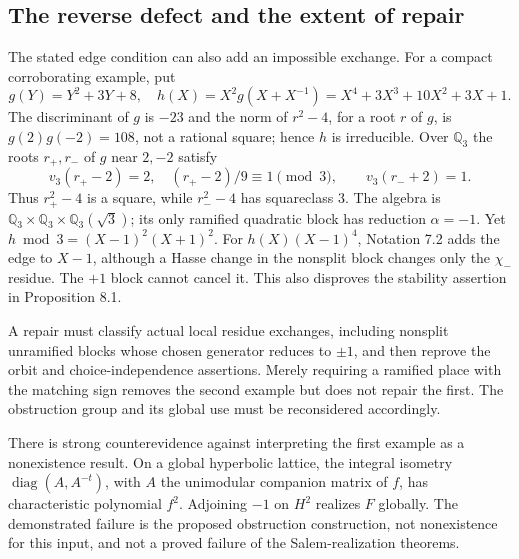 \documentclass[10pt]{article}
\begin{document}
\subsection*{The reverse defect and the extent of repair}
The stated edge condition can also add an impossible exchange. For a compact corroborating example, put \[g(Y)=Y^2+3Y+8,\quad
 h(X)=X^2g(X+X^{-1})=X^4+3X^3+10X^2+3X+1.\] The discriminant of \(g\) is \(-23\) and the norm of \(r^2-4\), for a root \(r\) of \(g\), is \(g(2)g(-2)=108\), not a rational square; hence \(h\) is irreducible. Over \(\mathbb Q_3\) the roots \(r_+,r_-\) of \(g\) near \(2,-2\) satisfy \[v_3(r_+-2)=2,\quad (r_+-2)/9\equiv1\pmod3,\qquad
 v_3(r_-+2)=1.\] Thus \(r_+^2-4\) is a square, while \(r_-^2-4\) has squareclass \(3\). The algebra is \(\mathbb Q_3\times\mathbb Q_3\times\mathbb Q_3(\sqrt3)\); its only ramified quadratic block has reduction \(\alpha=-1\). Yet \(h\bmod3=(X-1)^2(X+1)^2\). For \(h(X)(X-1)^4\), Notation 7.2 adds the edge to \(X-1\), although a Hasse change in the nonsplit block changes only the \(\chi_-\) residue. The \(+1\) block cannot cancel it. This also disproves the stability assertion in Proposition 8.1.\par
A repair must classify actual local residue exchanges, including nonsplit unramified blocks whose chosen generator reduces to \(\pm1\), and then reprove the orbit and choice-independence assertions. Merely requiring a ramified place with the matching sign removes the second example but does not repair the first. The obstruction group and its global use must be reconsidered accordingly.\par
There is strong counterevidence against interpreting the first example as a nonexistence result. On a global hyperbolic lattice, the integral isometry \(\operatorname{diag}(A,A^{-t})\), with \(A\) the unimodular companion matrix of \(f\), has characteristic polynomial \(f^2\). Adjoining \(-1\) on \(H^2\) realizes \(F\) globally. The demonstrated failure is the proposed obstruction construction, not nonexistence for this input, and not a proved failure of the Salem-realization theorems.\par
\end{document}
